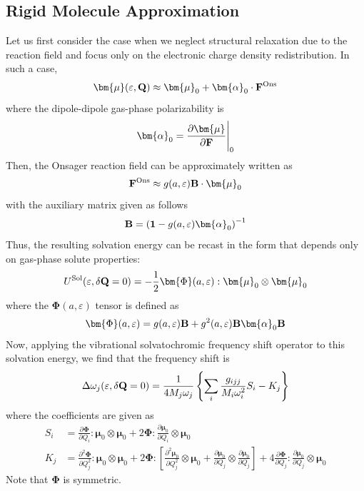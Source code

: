 \documentclass[a4paper,titlepage,twoside,fleqn,12pt]{book}
\newcommand{\BM}[1]{\bm{#1}}
\newcommand{\fderiv}[2]{\ensuremath{
    \frac{\partial #1}{\partial #2}}}
\newcommand{\sderiv}[2]{\ensuremath{
    \frac{\partial^2 #1}{\partial #2^2}
    }}
\begin{document}
\begin{refsection}
\subsection{Rigid Molecule Approximation}

Let us first consider the case when we neglect structural
relaxation due to the reaction field and focus only
on the electronic charge density redistribution. In such a case,
%
\begin{equation}
 {\BM \mu}(\varepsilon, {\bf Q}) \approx 
 {\BM \mu}_0 + {\BM \alpha}_0  \cdot {\bf F}^{\rm Ons}
\end{equation}
%
where the dipole\hyp{}dipole gas\hyp{}phase polarizability is
%
\begin{equation}
{\BM \alpha}_0  = \fderiv{{\BM \mu}}{\bf F}\Bigg|_{0}
\end{equation}
%
Then, the Onsager reaction field can be approximately written as
%
\begin{equation}
{\bf F}^{\rm Ons} \approx g(a,\varepsilon) {\bf B} \cdot {\BM \mu}_0
\end{equation}
%
with the auxiliary matrix given as follows
%
\begin{equation}
{\bf B} = \left( {\bf 1} - g(a,\varepsilon){\BM \alpha}_0 \right)^{-1}
\end{equation}
%
Thus, the resulting solvation energy can be recast in the form
that depends only on gas\hyp{}phase solute properties:
%
\begin{equation} \label{e:ons-e-sol-init}
U^{\rm Sol}(\varepsilon, \delta{\bf Q}=0) = -\frac{1}{2} {\BM \Phi}(a, \varepsilon) : {\BM \mu}_0 \otimes {\BM \mu}_0
\end{equation}
%
where the ${\BM \Phi}(a, \varepsilon)$ tensor is defined as
%
\begin{equation}
{\BM \Phi}(a, \varepsilon) = g(a,\varepsilon) {\bf B} + g^2(a,\varepsilon) {\bf B} {\BM \alpha}_0 {\bf B}
\end{equation}
%
Now, applying the vibrational solvatochromic frequency shift
operator to this solvation energy,
we find that the frequency shift is
%
\begin{equation} \label{e:dw-ons-working-form}
\Delta\omega_j(\varepsilon, \delta{\bf Q}=0) = \frac{1}{4M_j\omega_j}
\left\{ \sum_i \frac{g_{ijj}}{M_i\omega_i^2}S_i - K_j \right\}
\end{equation}
%
where the coefficients are given as
%
\begin{subequations}
 \begin{align}
  S_i &= \fderiv{{\BM \Phi}}{Q_i} : {\BM \mu}_0 \otimes {\BM \mu}_0 
           + 2{\BM \Phi} : \fderiv{{\BM \mu}_0}{Q_i} \otimes {\BM \mu}_0 \label{e:ons-si-init}\\
  K_j &= \sderiv{{\BM \Phi}}{Q_j} : {\BM \mu}_0 \otimes {\BM \mu}_0
           + 2{\BM \Phi} : \left[ \sderiv{{\BM \mu}_0}{Q_j} \otimes {\BM \mu}_0 
           +  \fderiv{{\BM \mu}_0}{Q_j} \otimes \fderiv{{\BM \mu}_0}{Q_j} \right] 
           + 4\fderiv{{\BM \Phi}}{Q_j} : \fderiv{{\BM \mu}_0}{Q_j} \otimes {\BM \mu}_0  \label{e:ons-ki-init}
 \end{align}
\end{subequations}
%
Note that ${\BM \Phi}$ is symmetric.  


\end{refsection}
\end{document}
